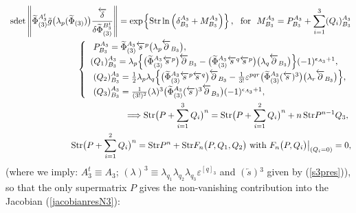 \documentclass[10pt]{article}
\begin{document}
\begin{eqnarray}
&\hspace{-0.5em}& \hspace{-0.5em}\mathrm{sdet}\left\|\widetilde{\Phi}{}^{A^t_3}_{(3)}\tilde{g}\big(\lambda_p(\widetilde{\Phi}_{(3)})\big)\frac{\overleftarrow{\delta}}{\delta \widetilde{\Phi}{}^{B^t_3}_{(3)}} \right\| =\exp \hspace{-0.1em%
}\left\{ \mathrm{Str}\,\mathrm{ln}\left( \delta
_{B_3}^{A_3}+M_{B_3}^{A_3}\right) \right\} ,\ \ \mathrm{for}\ \
M_{B_3}^{A_3}=P_{B_3}^{A_3}+\sum_{i=1}^3 (Q_i)_{B_3}^{A_3}  \label{jacobianN3YM} \\
&& \left\{\begin{array}{l}
\ P_{B_3}^{A_3} =\widetilde{\Phi}{}^{A_3}_{(3)}\overleftarrow{s}{}^{p}\big(\lambda _{p}\overleftarrow{\partial }%
_{B_3}\big) , \\
 (Q_1)_{B_3}^{A_3}=\lambda _{p}\Big\{\big(\widetilde{\Phi}{}^{A_3}_{(3)}\overleftarrow{s}{}^{p}\big)\overleftarrow{\partial }%
_{B_3}- \big(\widetilde{\Phi}{}^{A_3}_{(3)}\overleftarrow{s}{}^{q}\overleftarrow{s}{}^{p}\big)\big(\lambda_{q}%
\overleftarrow{\partial }_{B_{3}}\big)  \Big\}(-1)^{\epsilon _{A_3}+1},\\
\ (Q_2)_{B_3}^{A_3}=  \frac{1}{2}\lambda_p \lambda_q  \Big\{\big(\widetilde{\Phi}{}^{A_3}_{(3)}\overleftarrow{s}{}^{p}\overleftarrow{s}{}^{q}\big)%
\overleftarrow{\partial }_{B_{3}}- \frac{1}{ 3!}\varepsilon^{pqr} \big(\widetilde{\Phi}{}^{A_3}_{(3)}(\overleftarrow{s}){}^{3}\big)\big(\lambda_{r}%
\overleftarrow{\partial }_{B_3}\big)\Big\},\\
\  (Q_3)_{B_3}^{A_3}= \frac{1}{%
(3!)^2}(\lambda)^{3}\big(\widetilde{\Phi}{}^{A_3}_{(3)}(\overleftarrow{s}){}^{3}\overleftarrow{\partial }_{B_3}\big)(-1)^{\epsilon _{A_3}+1},
\end{array}\right. \label{PQiexp}\\
&&\ \Longrightarrow \mathrm{Str}\big(P+\sum_{i=1}^3 Q_i\big)^{n}=\mathrm{Str}\big(P+\sum_{i=1}^2 Q_i\big)^{n}+n\,\mathrm{Str}%
P^{n-1}Q_3,\
\label{jacobianN3YMrules} \\
&&\ \mathrm{Str}\big(P+\sum_{i=1}^2 Q_i\big)^{n}=
\mathrm{Str}P^{n}+ \mathrm{Str}F_n\big(P,Q_1,Q_2\big)
 \ \mathrm{with }\    F_n\big(P,Q_i\big)\big|_{(Q_i=0)}=0, \label{PQi}
\end{eqnarray}
(where we imply: $A^t_3\equiv A_3$;  $(\lambda)^{3} \equiv \lambda_{q_1}\lambda_{q_2}\lambda_{q_3}\varepsilon
^{[q]_3}$ and  $(\overleftarrow{s}){}^{3}$ given by (\ref{s3pres})), so that the only supermatrix $P$ gives the non-vanishing contribution into the Jacobian (\ref{jacobianresN3}):
\end{document}
